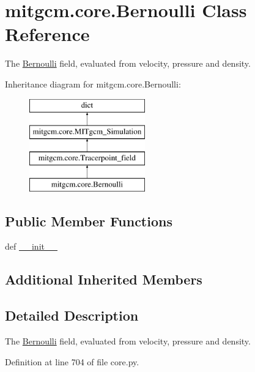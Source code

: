 \hypertarget{classmitgcm_1_1core_1_1Bernoulli}{\section{mitgcm.\+core.\+Bernoulli Class Reference}
\label{classmitgcm_1_1core_1_1Bernoulli}
}


The \hyperlink{classmitgcm_1_1core_1_1Bernoulli}{Bernoulli} field, evaluated from velocity, pressure and density.  


Inheritance diagram for mitgcm.\+core.\+Bernoulli\+:\begin{figure}[H]
\begin{center}
\leavevmode
\includegraphics[height=4.000000cm]{classmitgcm_1_1core_1_1Bernoulli}
\end{center}
\end{figure}
\subsection*{Public Member Functions}
\begin{DoxyCompactItemize}
\item 
def \hyperlink{classmitgcm_1_1core_1_1Bernoulli_a823e52977dd3ac349fb569eb3a4bf167}{\+\_\+\+\_\+init\+\_\+\+\_\+}
\end{DoxyCompactItemize}
\subsection*{Additional Inherited Members}


\subsection{Detailed Description}
The \hyperlink{classmitgcm_1_1core_1_1Bernoulli}{Bernoulli} field, evaluated from velocity, pressure and density. 



Definition at line 704 of file core.\+py.



